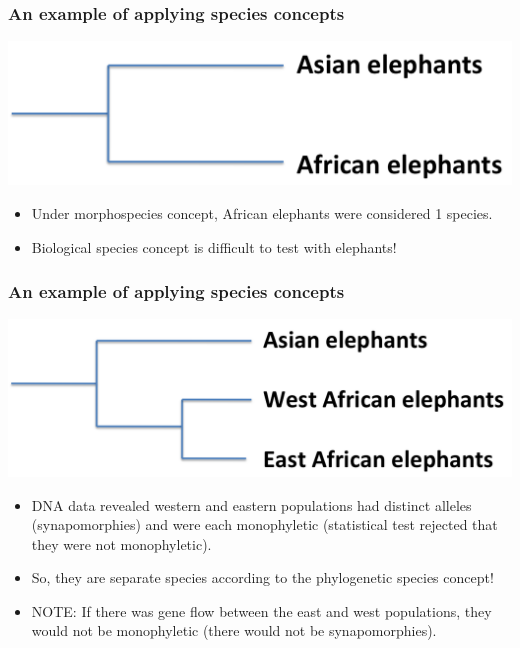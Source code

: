 \begin{frame}[t]
    \frametitle{An example of applying species concepts}
    \begin{adjustwidth}{-2em}{-1.5em}

        \begin{center} 
            \includegraphics[width=0.8\linewidth]{elephant-tree-2-tips.png}
        \end{center}

        \begin{itemize}[<+->]
            \item Under morphospecies concept, African elephants were
                considered 1 species.
            \item Biological species concept is difficult to test with
                elephants!
        \end{itemize}
    \end{adjustwidth}
\end{frame}

\begin{frame}[t]
    \frametitle{An example of applying species concepts}
    \begin{adjustwidth}{-2em}{-1.5em}

        \begin{center} 
            \includegraphics[width=0.8\linewidth]{elephant-tree-3-tips.png}
        \end{center}

        \begin{itemize}[<+->]
            \item DNA data revealed western and eastern populations had
                distinct alleles (synapomorphies) and were each monophyletic
                (statistical test rejected that they were not monophyletic).
            \item So, they are separate species according to the phylogenetic
                species concept!
            \item NOTE: If there was gene flow between the east and west
            populations, they would not be monophyletic (there would not be
            synapomorphies).
        \end{itemize}
    \end{adjustwidth}
\end{frame}

